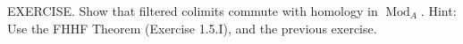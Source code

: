 EXERCISE. Show that filtered colimits commute with homology in $\operatorname{Mod}_A$. Hint: Use the FHHF Theorem (Exercise 1.5.I), and the previous exercise.
